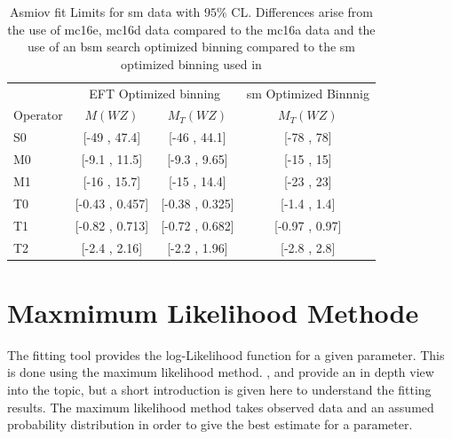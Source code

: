 \documentclass[../Bachelorarbeit.tex]{subfiles}
\begin{document}
\begin{table}
    \centering
    \begin{tabular}{l | c c | c }
        \hline
                 & \multicolumn{2}{c|}{EFT Optimized binning} & \acrshort{sm} Optimized Binnnig                  \\
        Operator & $M(WZ)$                                    & $M_{T}(WZ)$                     & $M_{T}(WZ)$    \\
        \hline
        S0       & [-49 , 47.4]                               & [-46 , 44.1]                    & [-78 , 78]     \\
        M0       & [-9.1 , 11.5]                              & [-9.3 , 9.65]                   & [-15 , 15]     \\
        M1       & [-16 , 15.7]                               & [-15 , 14.4]                    & [-23 , 23]     \\
        T0       & [-0.43 , 0.457]                            & [-0.38 , 0.325]                 & [-1.4 , 1.4]   \\
        T1       & [-0.82 , 0.713]                            & [-0.72 , 0.682]                 & [-0.97 , 0.97] \\
        T2       & [-2.4 , 2.16]                              & [-2.2 , 1.96]                   & [-2.8 , 2.8]   \\
        \hline
    \end{tabular}
    \caption{Asmiov fit Limits for \acrshort{sm} data with $95\%$ CL. Differences arise from the use of mc16e, mc16d data compared to the mc16a data and the use of an \acrshort{bsm} search optimized binning compared to the \acrshort{sm} optimized binning used in \cite{Sampsonidou.25.11.2021}}
    \label{tab:asimov}
\end{table}

\section{Maxmimum Likelihood Methode}
The fitting tool provides the log-Likelihood function for a given parameter. This is done using the maximum likelihood method. \cite{Prof.Dr.KlausReygersDr.RainerStamen.2020}, \cite{Prof.MarkusSchumacherDr.StanLai.2012} and \cite{K.F.RILEY.} provide an in depth view into the topic, but a short introduction is given here to understand the fitting results.
The maximum likelihood method takes observed data and an assumed probability distribution in order to give the best estimate for a parameter.
\end{document}
